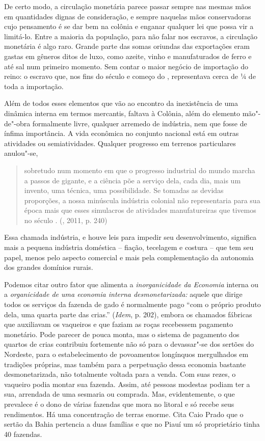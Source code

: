 {De certo modo, a circulação monetária parece passar sempre nas mesmas
mãos em quantidades dignas de consideração, e sempre naquelas mãos
conservadoras cujo pensamento é se dar bem na colônia e enganar qualquer
lei que possa vir a limitá-lo. Entre a maioria da população, para não
falar nos escravos, a circulação monetária é algo raro. Grande parte das
somas oriundas das exportações eram gastas em gêneros ditos de luxo,
como azeite, vinho e manufaturados de ferro e até sal num primeiro
momento. Sem contar o maior negócio de importação do reino: o escravo
que, nos fins do século  e começo do , representava cerca de ¼
de toda a importação.

Além de todos esses elementos que vão ao encontro da inexistência de uma
dinâmica interna em termos mercantis, faltava à Colônia, além do
elemento mão"-de"-obra formalmente livre, qualquer arremedo de indústria,
nem que fosse de ínfima importância. A vida econômica no conjunto
nacional está em outras atividades ou semiatividades. Qualquer progresso
em terrenos particulares anulou"-se,

\begin{quote}
sobretudo num momento em que o progresso industrial do mundo marcha a
passos de gigante, e a ciência põe a serviço dela, cada dia, mais um
invento, uma técnica, uma possibilidade. Se tomadas as devidas
proporções, a nossa minúscula indústria colonial não representaria para
sua época mais que esses simulacros de atividades manufatureiras que
tivemos no século . (, 2011, p. 240)
\end{quote}

Essa chamada indústria, e houve leis para impedir seu desenvolvimento,
significa mais a pequena indústria doméstica -- fiação, tecelagem e
costura -- que tem seu papel, menos pelo aspecto comercial e mais pela
complementação da autonomia dos grandes domínios rurais.

Podemos citar outro fator que alimenta a \emph{inorganicidade da
Economia} interna ou a \emph{organicidade de uma economia interna
desmonetarizada:} aquele que dirige todos os serviços da fazenda de gado
é normalmente pago ``com o próprio produto dela, uma quarta parte das
crias.'' (\emph{Idem}, p. 202), embora os chamados fábricas que
auxiliavam os vaqueiros e que faziam as roças recebessem pagamento
monetário. Pode parecer de pouca monta, mas o sistema de pagamento dos
quartos de crias contribuiu fortemente não só para o devassar"-se dos
sertões do Nordeste, para o estabelecimento de povoamentos longínquos
mergulhados em tradições próprias, mas também para a perpetuação dessa
economia bastante desmonetarizada, não totalmente voltada para a venda.
Com suas rezes, o vaqueiro podia montar sua fazenda. Assim, até pessoas
modestas podiam ter a sua, arrendada de uma sesmaria ou comprada. Mas,
evidentemente, o que prevalece é o dono de várias fazendas que mora no
litoral e só recebe seus rendimentos. Há uma concentração de terras
enorme. Cita Caio Prado que o sertão da Bahia pertencia a duas famílias
e que no Piauí um só proprietário tinha 40 fazendas.

}
